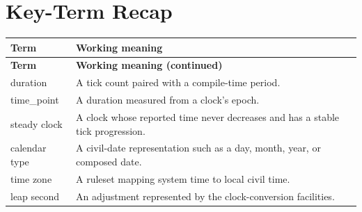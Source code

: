 \documentclass[11pt,letterpaper]{article}
\begin{document}
\section{Key-Term Recap}
\begin{longtable}{@{}>{\RaggedRight\arraybackslash}p{}>{\RaggedRight\arraybackslash}p{}@{}}\toprule\textbf{Term} & \textbf{Working meaning}\\\midrule\endfirsthead\toprule\textbf{Term} & \textbf{Working meaning (continued)}\\\midrule\endhead\bottomrule\endfoot
duration & A tick count paired with a compile-time period.\\
time\_\allowbreak{}point & A duration measured from a clock's epoch.\\
steady clock & A clock whose reported time never decreases and has a stable tick progression.\\
calendar type & A civil-date representation such as a day, month, year, or composed date.\\
time zone & A ruleset mapping system time to local civil time.\\
leap second & An adjustment represented by the clock-conversion facilities.\\
\end{longtable}
\end{document}
